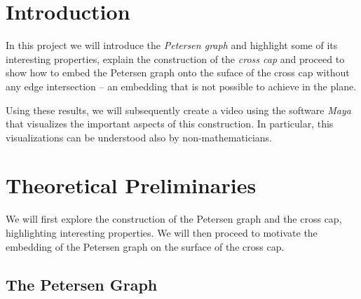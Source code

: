 \documentclass[12pt,            %
               a4paper,         %
               oneside,         %
               DIV12,           %
               fleqn,           %
               halfparskip,     %
               nochapterprefix, %
               bibtotocnumbered,%
              ]{scrartcl} %
\theoremstyle{definition}
\begin{document}
%
%
%




\section*{Introduction}

In this project we will introduce the \emph{Petersen graph} and highlight
some of its interesting properties, explain the construction of the
\emph{cross cap} and proceed to show how to embed the Petersen graph
onto the suface of the cross cap without any edge intersection --
an embedding that is not possible to achieve in the plane.

Using these results, we will subsequently create a video
using the software \emph{Maya} that visualizes the important aspects
of this construction. In particular, this visualizations can be
understood also by non-mathematicians.

\section{Theoretical Preliminaries}

We will first explore the construction of the Petersen graph and the
cross cap, highlighting interesting properties. We will then proceed
to motivate the embedding of the Petersen graph on the surface of the
cross cap.

\subsection{The Petersen Graph}
\end{document}
